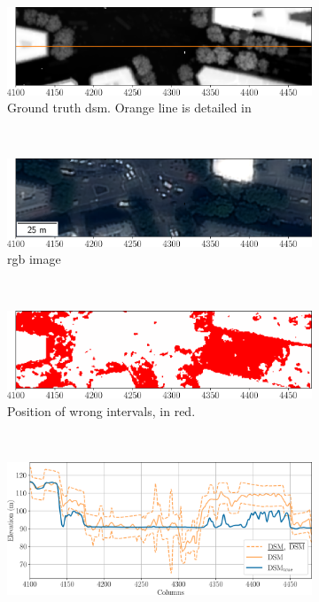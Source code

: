 \begin{figure}
    \centering
    \begin{subfigure}[t]{\linewidth}
        \flushright
        \includegraphics[width=0.95\linewidth]{Images/Chap_6/paris_error_tree_gt.png}
        \caption{Ground truth \acrshort{dsm}. Orange line is detailed in }
        \label{fig:paris_error_tree_gt}
    \end{subfigure}\\
    \begin{subfigure}[t]{\linewidth}
        \flushright
        \includegraphics[width=0.95\linewidth]{Images/Chap_6/paris_error_tree_clr.png}
        \caption{\acrshort{rgb} image}
        \label{fig:paris_error_tree_clr}
    \end{subfigure}\\
    \begin{subfigure}[t]{\linewidth}
        \flushright
        \includegraphics[width=0.95\linewidth]{Images/Chap_6/paris_error_tree_intervals.png}
        \caption{Position of wrong intervals, in red.}
        \label{fig:paris_error_tree_intervals}
    \end{subfigure}\\
    \begin{subfigure}[t]{\linewidth}
        \centering
        \includegraphics[width=\linewidth]{Images/Chap_6/paris_error_tree.png}

\end{subfigure}
\end{figure}
